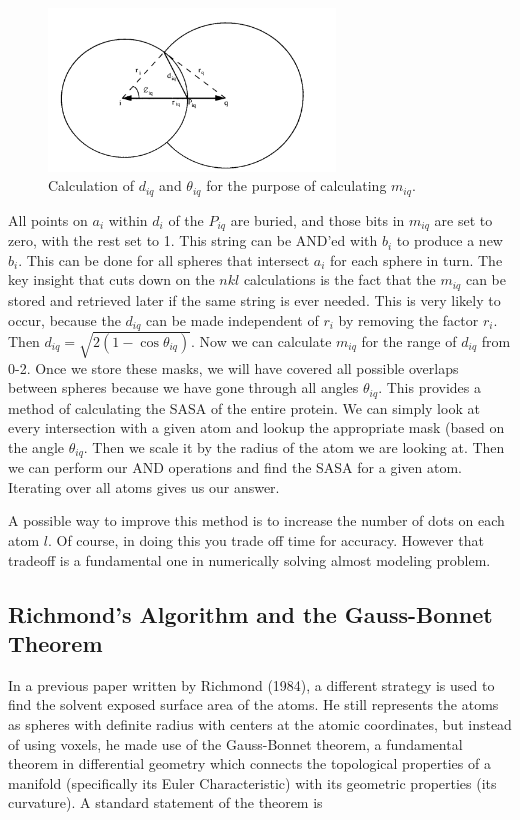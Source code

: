 \documentclass{article}
\begin{document}
\begin{figure}
\caption{Calculation of $d_{iq}$ and $\theta_{iq}$ for the purpose of calculating $m_{iq}$.}
\centerline{\includegraphics[width=3in]{mask}}
\end{figure}

All points on $a_i$ within $d_i$ of the $P_{iq}$ are buried, and those bits in $m_{iq}$ are set to zero, with the rest set to 1. This string can be AND'ed with $b_i$ to produce a new $b_i$. This can be done for all spheres that intersect $a_i$ for each sphere in turn. The key insight that cuts down on the $nkl$ calculations is the fact that the $m_{iq}$ can be stored and retrieved later if the same string is ever needed. This is very likely to occur, because the $d_{iq}$ can be made independent of $r_i$ by removing the factor $r_i$. Then $d_{iq}=\sqrt{2(1-\cos\theta_{iq})}$. Now we can calculate $m_{iq}$ for the range of $d_{iq}$ from 0-2. Once we store these masks, we will have covered all possible overlaps between spheres because we have gone through all angles $\theta_{iq}$.
This provides a method of calculating the SASA of the entire protein. We can simply look at every intersection with a given atom and lookup the appropriate mask (based on the angle $\theta_{iq}$. Then we scale it by the radius of the atom we are looking at. Then we can perform our AND operations and find the SASA for a given atom. Iterating over all atoms gives us our answer.

A possible way to improve this method is to increase the number of dots on each atom $l$. Of course, in doing this you trade off time for accuracy. However that tradeoff is a fundamental one in numerically solving almost modeling problem.
\subsection{Richmond's Algorithm and the Gauss-Bonnet Theorem}
In a previous paper written by Richmond (1984), a different strategy is used to find the solvent exposed surface area of the atoms. He still represents the atoms as spheres with definite radius with centers at the atomic coordinates, but instead of using voxels, he made use of the Gauss-Bonnet theorem, a fundamental theorem in differential geometry which connects the topological properties of a manifold (specifically its Euler Characteristic) with its geometric properties (its curvature). A standard statement of the theorem is 
\end{document}

